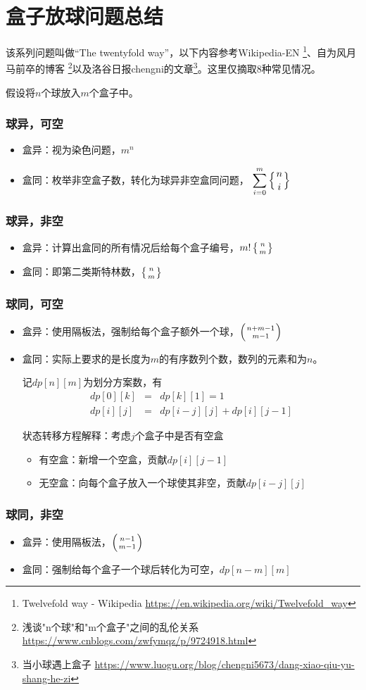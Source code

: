 \section{盒子放球问题总结}
该系列问题叫做``The twentyfold way''，以下内容参考Wikipedia-EN
\footnote{
    Twelvefold way - Wikipedia
    \url{https://en.wikipedia.org/wiki/Twelvefold\_way}
}、自为风月马前卒的博客
\footnote{
    浅谈"n个球"和"m个盒子"之间的乱伦关系
    \url{https://www.cnblogs.com/zwfymqz/p/9724918.html}
}以及洛谷日报chengni的文章\footnote{
    当小球遇上盒子
    \url{https://www.luogu.org/blog/chengni5673/dang-xiao-qiu-yu-shang-he-zi}
}。这里仅摘取8种常见情况。

假设将$n$个球放入$m$个盒子中。
\subsubsection{球异，可空}
\begin{itemize}
    \item 盒异：视为染色问题，$m^n$
    \item 盒同：枚举非空盒子数，转化为球异非空盒同问题，
    $\displaystyle\sum_{i=0}^m{\left\{n \atop i\right\}}$
\end{itemize}
\subsubsection{球异，非空}
\begin{itemize}
    \item 盒异：计算出盒同的所有情况后给每个盒子编号，$m!\left\{n \atop m\right\}$
    \item 盒同：即第二类斯特林数，$\left\{n \atop m\right\}$
\end{itemize}
\subsubsection{球同，可空}
\begin{itemize}
    \item 盒异：使用隔板法，强制给每个盒子额外一个球，$\left(n+m-1 \atop m-1\right)$
    \item 盒同：实际上要求的是长度为$m$的有序数列个数，数列的元素和为$n$。

    记$dp[n][m]$为划分方案数，有
    \begin{eqnarray*}
        dp[0][k]&=&dp[k][1]=1\\
        dp[i][j]&=&dp[i-j][j]+dp[i][j-1]
    \end{eqnarray*}

    状态转移方程解释：考虑$j$个盒子中是否有空盒

    \begin{itemize}
        \item 有空盒：新增一个空盒，贡献$dp[i][j-1]$
        \item 无空盒：向每个盒子放入一个球使其非空，贡献$dp[i-j][j]$
    \end{itemize}
\end{itemize}
\subsubsection{球同，非空}
\begin{itemize}
    \item 盒异：使用隔板法，$\left(n-1 \atop m-1\right)$
    \item 盒同：强制给每个盒子一个球后转化为可空，$dp[n-m][m]$
\end{itemize}
